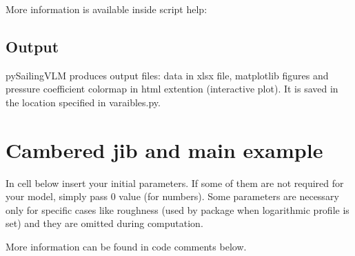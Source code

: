 \documentclass[a4paper,12pt,english]{jupyterBook}
\begin{document}
\sphinxAtStartPar
More information is available inside script help:

\begin{sphinxVerbatim}[commandchars=\\\{\}]
 
\end{sphinxVerbatim}


\chapter{Output}
\label{\detokenize{chapters/usage/usage:output}}
\sphinxAtStartPar
pySailingVLM produces output files: data in xlsx file, matplotlib figures and pressure coefficient colormap in html extention (interactive plot). It is saved in the location specified in varaibles.py.

\sphinxstepscope


\part{Cambered jib and main example}
\label{\detokenize{chapters/examples/sailingvlm_example:cambered-jib-and-main-example}}\label{\detokenize{chapters/examples/sailingvlm_example::doc}}
\sphinxAtStartPar
In cell below insert your initial parameters. If some of them are not required for your model, simply pass 0 value (for numbers).
Some parameters are necessary only for specific cases like roughness (used by package when logarithmic profile is set) and they are omitted during computation.



\sphinxAtStartPar
More information can be found in code comments below.
\end{document}
